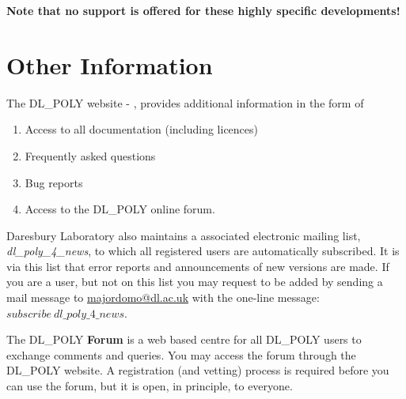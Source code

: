 {\bf Note that no support is offered for these highly specific
developments!}

\section{Other Information}\label{other}

The DL\_POLY website - \WEB{},
provides additional information in the form of
\begin{enumerate}
\item Access to all documentation (including licences)
\item Frequently asked questions
\item Bug reports
\item Access to the DL\_POLY online forum.
\end{enumerate}

\noindent
Daresbury Laboratory also maintains a \D associated electronic mailing
list, {\em dl\_poly\_4\_news}, to which all registered \D users
are automatically subscribed.  It is via this list that error reports
and announcements of new versions are made.  If you are a \D
user, but not on this list you may request to be added by sending
a mail message to {\href{mailto:majordomo@dl.ac.uk}{majordomo@dl.ac.uk}}
with the one-line message: $subscribe~dl\_poly\_4\_news$.

The DL\_POLY {\bf Forum} is a web based centre for all DL\_POLY users
to exchange comments and queries.  You may access the forum through the
DL\_POLY website.  A registration (and vetting) process is required
before you can use the forum, but it is open, in principle, to everyone.
